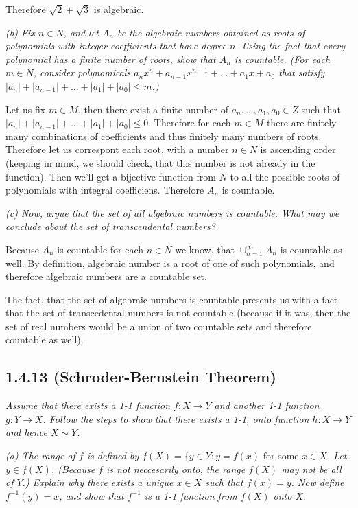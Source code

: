 \documentclass[11pt,oneside,titlepage]{book}
\begin{document}
Therefore $\sqrt{2} + \sqrt{3}$ is algebraic.

\textit{(b) Fix $n \in N$, and let $A_n$ be the algebraic numbers obtained as roots of
  polynomials with integer coefficients that have degree $n$. Using the fact that
  every polynomial has a finite number of roots, show that $A_n$ is countable. (For
  each $m \in N$, consider polynomicals $a_n x^n + a_{n - 1} x^{n - 1} + ... +
  a_1 x + a_0$ that satisfy $|a_n| + |a_{n - 1}| + ... + |a_1| + |a_0| \leq m$.)}

Let us fix $m \in M$, then there exist a finite number of $a_n, ..., a_1, a_0 \in Z$ such that
$|a_n| + |a_{n - 1}| + ... + |a_1| + |a_0| \leq 0$. Therefore for each $m \in M$ there
are finitely many combinations of coefficients and thus finitely many numbers of roots.
Therefore let us correspont each root, with a number $n \in N$ is ascending order
(keeping in mind, we should check, that this number is not already in the function). Then
we'll get a bijective  function from $N$ to all the possible roots of polynomials
with integral coefficiens. Therefore $A_n$ is countable.

\textit{(c) Now, argue that the set of all algebraic numbers is countable. What may we
  conclude about the set of transcendental numbers?}

Because $A_n$ is countable for each $n \in N$ we know, that
$\cup^{\infty}_{n = 1}A_n$ is countable as well. By definition, algebraic number
is a root of one of such polynomials, and therefore algebraic numbers are a countable
set.

The fact, that the set of algebraic numbers is countable presents us with a fact, that
the set of transcedental numbers is not countable (because if it was, then the set
of real numbers would be a union of two countable sets and therefore countable as
well).

\subsection*{1.4.13 (Schroder-Bernstein Theorem)}
\textit{Assume that there exists a 1-1 function $f: X \to Y$ and another 1-1 function
  $g: Y \to X$. Follow the steps to show that there exists a 1-1, onto function $h: X \to Y$
  and hence $X \sim Y$.}

\textit{(a) The range of $f$ is defined by $f(X) = \{y \in Y: y = f(x) \text{ for some }
  x \in X$. Let $y \in f(X)$. (Because $f$ is not neccesarily onto, the range $f(X)$
  may not be all of $Y$.) Explain why there exists a unique $x \in X$ such that $f(x) = y$.
  Now define $f^{-1}(y) = x$, and show that $f^{-1}$ is a 1-1 function from $f(X)$ onto $X$.}
\end{document}
